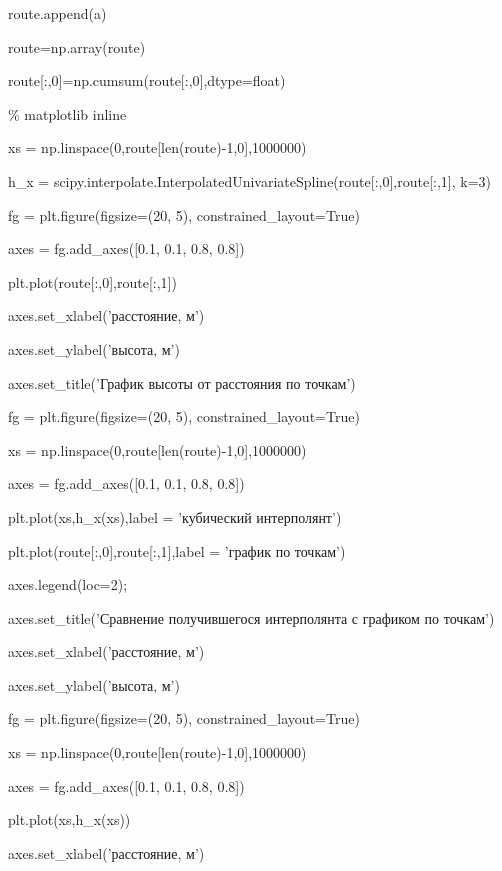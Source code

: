 \documentclass[A4paper,12pt]{article}
\theoremstyle{plain} %
\theoremstyle{definition} %
\theoremstyle{remark} %
\begin{document}
    route.append(a)
    
    \noindent route=np.array(route)
    
    \noindent route[:,0]=np.cumsum(route[:,0],dtype=float)
    
    \noindent \% matplotlib inline
    
    \noindent xs = np.linspace(0,route[len(route)-1,0],1000000)
    
    \noindent h\_x = scipy.interpolate.InterpolatedUnivariateSpline(route[:,0],route[:,1], k=3)
    
    \noindent fg = plt.figure(figsize=(20, 5), constrained\_layout=True)
    
    \noindent axes = fg.add\_axes([0.1, 0.1, 0.8, 0.8])
    
    \noindent plt.plot(route[:,0],route[:,1])
    
    \noindent axes.set\_xlabel('расстояние, м')
    
    \noindent axes.set\_ylabel('высота, м')
    
    \noindent axes.set\_title('График высоты от расстояния по точкам')
    
    \noindent fg = plt.figure(figsize=(20, 5), constrained\_layout=True)
    
    \noindent xs = np.linspace(0,route[len(route)-1,0],1000000)
    
    \noindent axes = fg.add\_axes([0.1, 0.1, 0.8, 0.8])
    
    \noindent plt.plot(xs,h\_x(xs),label = 'кубический интерполянт')
    
    \noindent plt.plot(route[:,0],route[:,1],label = 'график по точкам')
    
    \noindent axes.legend(loc=2);
    
    \noindent axes.set\_title('Сравнение получившегося интерполянта с графиком по точкам')
    
    \noindent axes.set\_xlabel('расстояние, м')
    
    \noindent axes.set\_ylabel('высота, м')
    
    \noindent fg = plt.figure(figsize=(20, 5), constrained\_layout=True)
     
    \noindent xs = np.linspace(0,route[len(route)-1,0],1000000)
     
    \noindent axes = fg.add\_axes([0.1, 0.1, 0.8, 0.8])
    
    \noindent plt.plot(xs,h\_x(xs))
     
    \noindent axes.set\_xlabel('расстояние, м')
     
\end{document}
